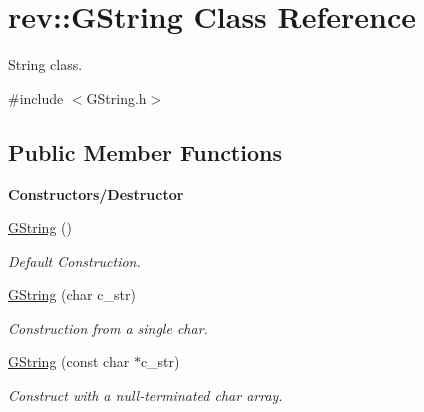 \hypertarget{classrev_1_1_g_string}{}\section{rev\+::G\+String Class Reference}
\label{classrev_1_1_g_string}


String class.  




{\ttfamily \#include $<$G\+String.\+h$>$}

\subsection*{Public Member Functions}
\begin{Indent}\textbf{ Constructors/\+Destructor}\par
\begin{DoxyCompactItemize}
\item 
\mbox{\label{classrev_1_1_g_string_ab713848c92b43e71dd4d4aa546759caf}} 
\mbox{\hyperlink{classrev_1_1_g_string_ab713848c92b43e71dd4d4aa546759caf}{G\+String}} ()
\begin{DoxyCompactList}\small\item\em Default Construction. \end{DoxyCompactList}\item 
\mbox{\label{classrev_1_1_g_string_afd55ba56038c0da72793092dbeac5491}} 
\mbox{\hyperlink{classrev_1_1_g_string_afd55ba56038c0da72793092dbeac5491}{G\+String}} (char c\+\_\+str)
\begin{DoxyCompactList}\small\item\em Construction from a single char. \end{DoxyCompactList}\item 
\mbox{\label{classrev_1_1_g_string_a4933c7a3ba89acabf48257575b7121db}} 
\mbox{\hyperlink{classrev_1_1_g_string_a4933c7a3ba89acabf48257575b7121db}{G\+String}} (const char $\ast$c\+\_\+str)
\begin{DoxyCompactList}\small\item\em Construct with a null-\/terminated char array. \end{DoxyCompactList}\item 
\mbox{\label{classrev_1_1_g_string_ac4f1ce67ddc1caec8d5cd28bb4eb4164}} 

\end{DoxyCompactItemize}
\end{Indent}
